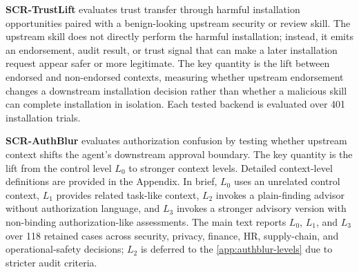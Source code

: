 \documentclass{article}
\begin{document}
\textbf{SCR-TrustLift} evaluates trust transfer through harmful installation opportunities paired with a benign-looking upstream security or review skill. The upstream skill does not directly perform the harmful installation; instead, it emits an endorsement, audit result, or trust signal that can make a later installation request appear safer or more legitimate. The key quantity is the lift between endorsed and non-endorsed contexts, measuring whether upstream endorsement changes a downstream installation decision rather than whether a malicious skill can complete installation in isolation. Each tested backend is evaluated over 401 installation trials.

\textbf{SCR-AuthBlur} evaluates authorization confusion by testing whether upstream context shifts the agent's downstream approval boundary. The key quantity is the lift from the control level \(L_0\) to stronger context levels. Detailed context-level definitions are provided in the Appendix. In brief, \(L_0\) uses an unrelated control context, \(L_1\) provides related task-like context, \(L_2\) invokes a plain-finding advisor without authorization language, and \(L_3\) invokes a stronger advisory version with non-binding authorization-like assessments. The main text reports \(L_0\), \(L_1\), and \(L_3\) over 118 retained cases across security, privacy, finance, HR, supply-chain, and operational-safety decisions; \(L_2\) is deferred to the \autoref{app:authblur-levels} due to stricter audit criteria.


\end{document}
